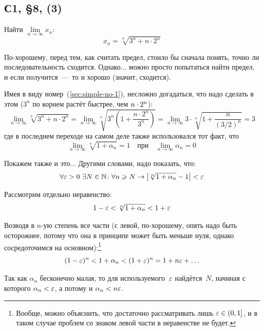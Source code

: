 \documentclass[a4paper,12pt]{article}
\begin{document}
  
  \subsection{С1, \S 8, (3)}
  
  Найти $\lim\limits_{n \to \infty} x_n$:
  \[
    x_n = \sqrt[n]{3^n + n \cdot 2^n}
  \]
  
  \begin{solution}
    По-хорошему, перед тем, как считать предел, стоило бы сначала понять, точно ли последовательность сходится.
    Однако... можно просто попытаться найти предел, и если получится~---~то и хорошо (значит, сходится).
    
    Имея в виду номер~(\ref{sec:simple-no-1}), несложно догадаться, что надо сделать в этом ($3^n$ по корнем растёт быстрее, чем $n \hm\cdot 2^n$):
    \[
      \lim\limits_{n \to \infty} \sqrt[n]{3^n + n \cdot 2^n}
        = \lim\limits_{n \to \infty} \sqrt[n]{3^n \left(1 + \frac{n \cdot 2^n}{3^n}\right)}
        = \lim\limits_{n \to \infty} 3 \cdot \sqrt[n]{1 + \frac{n}{(3/2)^n}}
        = 3
    \]
    где в последнем переходе на самом деле также использовался тот факт, что
    \[
      \lim_{n \to \infty} \sqrt[n]{1 + \alpha_n} = 1\quad \mbox{при}\quad \lim_{n \to \infty} \alpha_n = 0
    \]
    
    Покажем также и это...
    Другими словами, надо показать, что:  %
    \[
      \forall \varepsilon > 0\ \exists N \in \mathbb N\colon \forall n \geqslant N \to \left|\sqrt[n]{1 + \alpha_n} - 1\right| < \varepsilon
    \]
    
    Рассмотрим отдельно неравенство:
    \[
      1 - \varepsilon < \sqrt[n]{1 + \alpha_n} < 1 + \varepsilon
    \]
    
    Возводя в $n$-ую степень все части (с левой, по-хорошему, опять надо быть осторожнее, потому что она в принципе может быть меньше нуля, однако сосредоточимся на основном):\footnote{
      Вообще, можно объяснить, что достаточно рассматривать лишь $\varepsilon \in (0, 1]$, и в таком случае проблем со знаком левой части в неравенстве не будет.
    }
    \[
      (1 - \varepsilon)^n < 1 + \alpha_n < (1 + \varepsilon)^n = 1 + n \varepsilon + \ldots
    \]
    
    Так как $\alpha_n$ бесконечно малая, то для используемого~$\varepsilon$ найдётся~$N$, начиная с которого $\alpha_n \hm< \eps$, а потому и $\alpha_n \hm< n \eps$.
  \end{solution}
  
\end{document}
